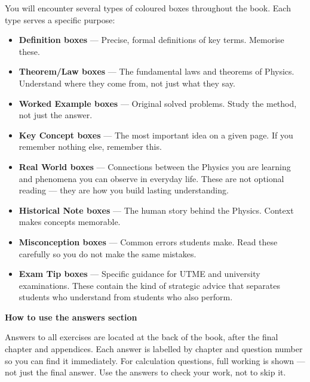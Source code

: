 You will encounter several types of coloured boxes throughout
the book. Each type serves a specific purpose:

\begin{itemize}
  \item \textcolor{codexblue}{\textbf{Definition boxes}} ---
  Precise, formal definitions of key terms. Memorise these.

  \item \textcolor{codexred}{\textbf{Theorem/Law boxes}} ---
  The fundamental laws and theorems of Physics. Understand
  where they come from, not just what they say.

  \item \textcolor{codexgreen}{\textbf{Worked Example boxes}}
  --- Original solved problems. Study the method, not just
  the answer.

  \item \textcolor{codexgold}{\textbf{Key Concept boxes}} ---
  The most important idea on a given page. If you remember
  nothing else, remember this.

  \item \textcolor{codexgreen!70!black}{\textbf{Real World
  boxes}} --- Connections between the Physics you are learning
  and phenomena you can observe in everyday life. These are
  not optional reading --- they are how you build lasting
  understanding.

  \item \textcolor{codexgold!70!black}{\textbf{Historical
  Note boxes}} --- The human story behind the Physics.
  Context makes concepts memorable.

  \item \textcolor{codexred!80!black}{\textbf{Misconception
  boxes}} --- Common errors students make. Read these
  carefully so you do not make the same mistakes.

  \item \textcolor{codexgold}{\textbf{Exam Tip boxes}} ---
  Specific guidance for UTME and university examinations.
  These contain the kind of strategic advice that separates
  students who understand from students who also perform.
\end{itemize}

\vspace{0.5cm}
\textbf{How to use the answers section}
\vspace{0.3cm}

Answers to all exercises are located at the back of the book,
after the final chapter and appendices. Each answer is labelled
by chapter and question number so you can find it immediately.
For calculation questions, full working is shown --- not just
the final answer. Use the answers to check your work, not to
skip it.

